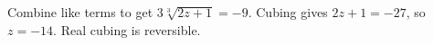 Combine like terms to get $3\sqrt[3]{2z+1}=-9$. Cubing gives $2z+1=-27$, so $\boxed{z=-14}$. Real cubing is reversible.
